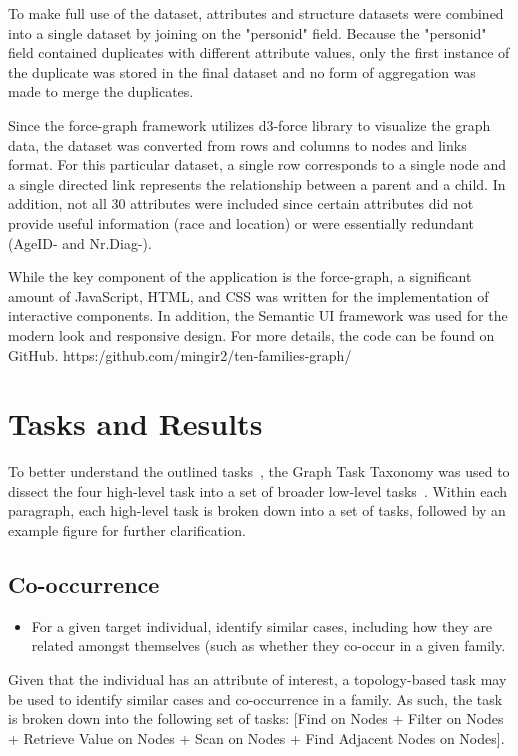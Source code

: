 \documentclass{vgtc}                          %
\begin{document}
To make full use of the dataset, attributes and structure datasets were combined into a single dataset by joining on the "personid" field. Because the "personid" field contained duplicates with different attribute values, only the first instance of the duplicate was stored in the final dataset and no form of aggregation was made to merge the duplicates.

Since the force-graph framework utilizes d3-force library to visualize the graph data, the dataset was converted from rows and columns to nodes and links format. For this particular dataset, a single row corresponds to a single node and a single directed link represents the relationship between a parent and a child. In addition, not all 30 attributes were included since certain attributes did not provide useful information (race and location) or were essentially redundant (AgeID- and Nr.Diag-).

While the key component of the application is the force-graph, a significant amount of JavaScript, HTML, and CSS was written for the implementation of interactive components. In addition, the Semantic UI framework was used for the modern look and responsive design. For more details, the code can be found on GitHub. https:/github.com/mingir2/ten-families-graph/ 

\section{Tasks and Results}

To better understand the outlined tasks~\cite{BioVis:2020:WS}, the Graph Task Taxonomy was used to dissect the four high-level task into a set of broader low-level tasks~\cite{Lee:2006:TTGV}. Within each paragraph, each high-level task is broken down into a set of tasks, followed by an example figure for further clarification.

\subsection{Co-occurrence}

\begin{itemize}
\item{For a given target individual, identify similar cases, including
how they are related amongst themselves (such as whether they co-occur
in a given family.}
\end{itemize}

Given that the individual has an attribute of interest, a topology-based task may be used to identify similar cases and co-occurrence in a family. As such, the task is broken down into the following set of tasks: [Find on Nodes + Filter on Nodes + Retrieve Value on Nodes + Scan on Nodes + Find Adjacent Nodes on Nodes].
\end{document}

